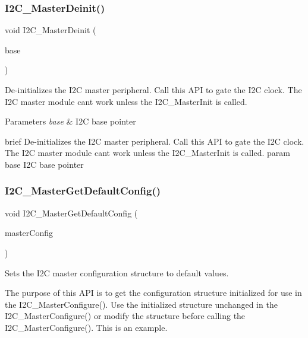\subsubsection{\texorpdfstring{I2C\_MasterDeinit()}{I2C\_MasterDeinit()}}
{\footnotesize\ttfamily void I2\+C\+\_\+\+Master\+Deinit (\begin{DoxyParamCaption}\item[{\mbox{\hyperlink{struct_i2_c___type}{I2\+C\+\_\+\+Type}} $\ast$}]{base }\end{DoxyParamCaption})}



De-\/initializes the I2C master peripheral. Call this A\+PI to gate the I2C clock. The I2C master module can\textquotesingle{}t work unless the I2\+C\+\_\+\+Master\+Init is called. 


\begin{DoxyParams}{Parameters}
{\em base} & I2C base pointer\\
\hline
\end{DoxyParams}
brief De-\/initializes the I2C master peripheral. Call this A\+PI to gate the I2C clock. The I2C master module can\textquotesingle{}t work unless the I2\+C\+\_\+\+Master\+Init is called. param base I2C base pointer \mbox{\label{group__i2c__driver_gad69f2d63ea756dda60749ff6b09f587d}} 
\subsubsection{\texorpdfstring{I2C\_MasterGetDefaultConfig()}{I2C\_MasterGetDefaultConfig()}}
{\footnotesize\ttfamily void I2\+C\+\_\+\+Master\+Get\+Default\+Config (\begin{DoxyParamCaption}\item[{\mbox{\hyperlink{group__i2c__driver_gad739710b6b65e12ca5ba9dc2a2a2b463}{i2c\+\_\+master\+\_\+config\+\_\+t}} $\ast$}]{master\+Config }\end{DoxyParamCaption})}



Sets the I2C master configuration structure to default values. 

The purpose of this A\+PI is to get the configuration structure initialized for use in the I2\+C\+\_\+\+Master\+Configure(). Use the initialized structure unchanged in the I2\+C\+\_\+\+Master\+Configure() or modify the structure before calling the I2\+C\+\_\+\+Master\+Configure(). This is an example. 
\begin{DoxyCode}{0}
\end{DoxyCode}
 

